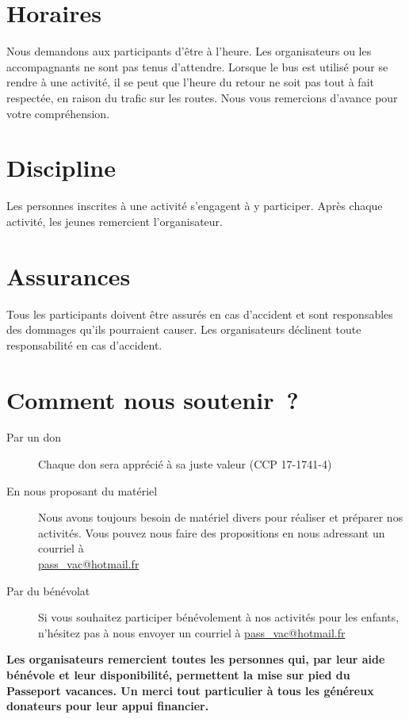 \section*{Horaires}

Nous demandons aux participants d'être à l'heure. Les organisateurs ou les accompagnants ne sont pas tenus d'attendre. Lorsque le bus est utilisé pour se rendre à une activité, il se peut que l'heure du retour ne soit pas tout à fait respectée, en raison du trafic sur les routes. Nous vous remercions d'avance pour votre compréhension.

\section*{Discipline}

Les personnes inscrites à une activité s'engagent à y participer. Après chaque activité, les jeunes remercient l'organisateur.

\section*{Assurances}

Tous les participants doivent être assurés en cas d'accident et sont responsables des dommages qu'ils pourraient causer. Les organisateurs déclinent toute responsabilité en cas d'accident.

\section*{Comment nous soutenir ?}

\begin{description}
	\item [Par un don]
	Chaque don sera apprécié à sa juste valeur (CCP 17-1741-4)
	\item [En nous proposant du matériel]
	Nous avons toujours besoin de matériel divers pour réaliser et préparer
	nos activités. Vous pouvez nous faire des propositions en nous adressant
	un courriel à\\
	\url{pass\_vac@hotmail.fr}
	\item [Par du bénévolat]
	Si vous souhaitez participer bénévolement à nos activités pour les
	enfants, n’hésitez pas à nous envoyer un courriel à \url{pass_vac@hotmail.fr}
\end{description}

\textbf{Les organisateurs remercient toutes les personnes qui, par leur aide bénévole et leur disponibilité, permettent la mise sur pied du Passeport vacances. Un merci tout particulier à tous les généreux donateurs pour leur appui financier.
}
